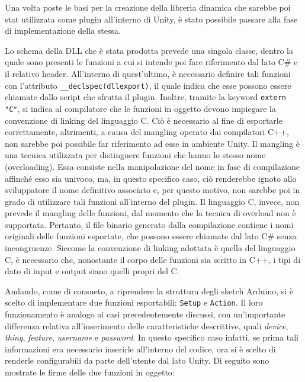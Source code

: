 Una volta poste le basi per la creazione della libreria dinamica che sarebbe poi stat utilizzata come plugin all'interno di Unity, è stato possibile passare alla fase di implementazione della stessa.

Lo schema della DLL che è stata prodotta prevede una singola classe, dentro la quale sono presenti le funzioni a cui si intende poi fare riferimento dal lato C\# e il relativo header. All'interno di quest'ultimo, è necessario definire tali funzioni con l’attributo \texttt{\_\_declspec(dllexport)}, il quale indica che esse possono essere chiamate dallo script che sfrutta il plugin. Inoltre, tramite la keyword \texttt{extern "C"}, si indica al compilatore che le funzioni in oggetto devono impiegare la convenzione di linking del linguaggio C. Ciò è necessario al fine di esportarle correttamente, altrimenti, a causa del mangling operato dai compilatori C++, non sarebbe poi possibile far riferimento ad esse in ambiente Unity. Il mangling è una tecnica utilizzata per distinguere funzioni che hanno lo stesso nome (overloading). Essa consiste nella manipolazione del nome in fase di compilazione affinché esso sia univoco, ma, in questo specifico caso, ciò renderebbe ignoto allo sviluppatore il nome definitivo associato e, per questo motivo, non sarebbe poi in grado di utilizzare tali funzioni all'interno del plugin. Il linguaggio C, invece, non prevede il mangling delle funzioni, dal momento che la tecnica di overload non è supportata. Pertanto, il file binario generato dalla compilazione contiene i nomi originali delle funzioni esportate, che possono essere chiamate dal lato C\# senza incongruenze. Siccome la convenzione di linking adottata è quella del linguaggio C, è necessario che, nonostante il corpo delle funzioni sia scritto in C++, i tipi di dato di input e output siano quelli propri del C.

Andando, come di consueto, a riprendere la struttura degli sketch Arduino, si è scelto di implementare due funzioni esportabili: \texttt{Setup} e \texttt{Action}. Il loro funzionamento è analogo ai casi precedentemente discussi, con un’importante differenza relativa all'inserimento delle caratteristiche descrittive, quali \textit{device}, \textit{thing}, \textit{feature}, \textit{username} e \textit{password}. In questo specifico caso infatti, se prima tali informazioni era necessario inserirle all'interno del codice, ora si è scelto di renderle configurabili da parte dell'utente dal lato Unity. Di seguito sono mostrate le firme delle due funzioni in oggetto:

